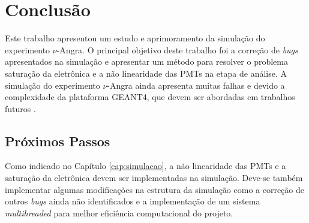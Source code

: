 \chapter{Conclusão} \label{cap:conclusao}
\vspace{-2cm}

Este trabalho apresentou um estudo e aprimoramento da simulação do experimento $\nu$-Angra. O principal objetivo deste trabalho foi a correção de \emph{bugs} apresentados na simulação e apresentar um método para resolver o problema saturação da eletrônica e a não linearidade das PMTs na etapa de análise. A simulação do experimento $\nu$-Angra ainda apresenta muitas falhas e devido a complexidade da plataforma GEANT4, que devem ser abordadas em trabalhos futuros .

\section{Próximos Passos}

Como indicado no Capítulo \ref{cap:simulacao}, a não linearidade das PMTs e a saturação da eletrônica devem ser implementadas na simulação. Deve-se também implementar algumas modificações na estrutura da simulação como a correção de outros \emph{bugs} ainda não identificados e a implementação de um sistema \emph{multihreaded} para melhor eficiência computacional do projeto.